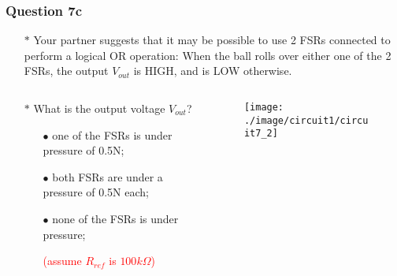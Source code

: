 \documentclass{beamer}
\newcommand{\red}[1]{\textcolor{red}{#1}}
\begin{document}
\begin{frame}
\frametitle{Question 7c}
\begin{itemize} \itemsep1pt \parskip0pt 
  \item[$\ast$] Your partner suggests that it may be possible to use 2 FSRs connected to perform a logical OR operation: When the ball rolls over either one of the 2 FSRs, the output $V_{out}$ is HIGH, and is LOW otherwise.


\end{itemize}
\begin{columns}
\begin{column}{8.5cm}
\begin{itemize} \itemsep1pt \parskip0pt 
  \item[$\ast$] What is the output voltage $V_{out}$?
  \begin{itemize} \itemsep1pt \parskip0pt 
  \item[$\bullet$] one of the FSRs is under pressure of 0.5N;
  \item[$\bullet$] both FSRs are under a pressure of 0.5N each;
  \item[$\bullet$] none of the FSRs is under pressure;
  \item[] \red{(assume $R_{ref}$ is $100k \Omega$)}
  \end{itemize}
\end{itemize}
\end{column}


\begin{column}{4cm}
\begin{figure}[H]
  \centering
  \texttt{[image: ./image/circuit1/circuit7\_2]}
\end{figure}
\end{column}



\end{columns}

\end{frame}

\end{document}
